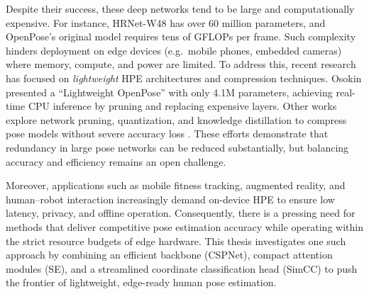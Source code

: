 Despite their success, these deep networks tend to be large and computationally expensive. For instance, HRNet-W48 has over 60 million parameters, and OpenPose’s original model requires tens of GFLOPs per frame. Such complexity hinders deployment on edge devices (e.g.\ mobile phones, embedded cameras) where memory, compute, and power are limited. To address this, recent research has focused on \emph{lightweight} HPE architectures and compression techniques. Osokin \citep{Osokin2018} presented a “Lightweight OpenPose” with only 4.1M parameters, achieving real-time CPU inference by pruning and replacing expensive layers. Other works explore network pruning, quantization, and knowledge distillation to compress pose models without severe accuracy loss \citep{Lan2023}. These efforts demonstrate that redundancy in large pose networks can be reduced substantially, but balancing accuracy and efficiency remains an open challenge.

Moreover, applications such as mobile fitness tracking, augmented reality, and human–robot interaction increasingly demand on-device HPE to ensure low latency, privacy, and offline operation. Consequently, there is a pressing need for methods that deliver competitive pose estimation accuracy while operating within the strict resource budgets of edge hardware. This thesis investigates one such approach by combining an efficient backbone (CSPNet), compact attention modules (SE), and a streamlined coordinate classification head (SimCC) to push the frontier of lightweight, edge-ready human pose estimation.